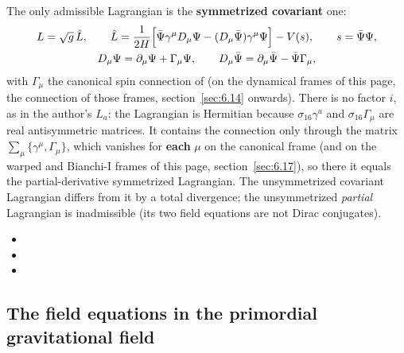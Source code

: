 The only admissible Lagrangian is the \textbf{symmetrized covariant} one:
\begin{gather*}
  L=\sqrt g\,\hat L,\qquad
  \hat L=\frac{1}{2H}\Bigl[\bar\Psi\gamma^\mu D_\mu\Psi-(D_\mu\bar\Psi)\gamma^\mu\Psi\Bigr]-V(s),\qquad s=\bar\Psi\Psi,\\
  D_\mu\Psi=\partial_\mu\Psi+\Gamma_\mu\Psi,\qquad D_\mu\bar\Psi=\partial_\mu\bar\Psi-\bar\Psi\Gamma_\mu ,
\end{gather*}
with $\Gamma_\mu$ the canonical spin connection of  (on the dynamical frames of this page,
the connection of those frames, section~\ref{sec:6.14} onwards). There is no factor $i$, as in the
author's $L_a$: the Lagrangian is Hermitian because $\sigma_{16}\gamma^a$ and $\sigma_{16}\Gamma_\mu$
are real antisymmetric matrices. It contains the connection only through the matrix
$\sum_\mu\{\gamma^\mu,\Gamma_\mu\}$, which vanishes for \textbf{each} $\mu$ on the canonical frame (and on
the warped and Bianchi-I frames of this page, section~\ref{sec:6.17}), so there it equals the
partial-derivative symmetrized Lagrangian. The unsymmetrized covariant Lagrangian differs from it by a
total divergence; the unsymmetrized \emph{partial} Lagrangian is inadmissible (its two field equations
are not Dirac conjugates). 
\begin{itemize}
  \item {}
  \item {}
  \item {}
\end{itemize}

\subsection{The field equations in the primordial gravitational field}
\label{sec:3.3}

